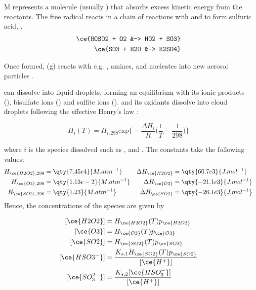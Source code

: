 M represents a molecule (usually ) that absorbs excess kinetic energy from the reactants. The free radical  reacts in a chain of reactions with  and  to form sulfuric acid, .
\begin{align}
\ce{HOSO2 + O2 &-> HO2 + SO3}\\
\ce{SO3 + H2O &-> H2SO4}
\end{align}

Once formed,  (g) reacts with e.g. , amines,  and nucleates into new aerosol particles \citep{seinfeldAtmosphericChemistryPhysics2016}.


 can dissolve into liquid droplets, forming an equilibrium with its ionic products (), bisulfate ions () and sulfite ions ().  and its oxidants dissolve into cloud droplets following the effective Henry's law \citep{seinfeldAtmosphericChemistryPhysics2016}: 

\begin{equation}
    H_i(T) = H_{i,298}\mathrm{exp} \bigg\{ -\frac{\Delta H_i}{R} \bigg( \frac{1}{T} - \frac{1}{298} \bigg) \bigg\} \label{ch1:eq:Henry-eq}
\end{equation}

where $i$ is the species dissolved such as ,  and .  The constants take the following values: 
\begin{align*}
H_{\ce{H2O2}, 298} &= \qty{7.45e4}{M.atm^{-1}} & 
\Delta H_{\ce{H2O2}} &= \qty{60.7e3}{J.mol^{-1}} \\
H_{\ce{O3}, 298}&=\qty{1.13e-2 }{M.atm^{-1}} & 
\Delta H_{\ce{O3}}&= \qty{-21.1e3}{J.mol^{-1}} \\
H_{\ce{SO2}, 298}&=\qty{1.23}{M.atm^{-1}} 
& \Delta H_{\ce{SO2}}&=\qty{-26.1e3}{J.mol^{-1}} 
\end{align*}
Hence, the concentrations of the species are given by

\begin{equation}
    \begin{aligned}
    \relax
        [\ce{H2O2}] & = H_{\ce{H2O2}}(T)p_{\ce{H2O2}} \\
        [\ce{O3}] & = H_{\ce{O3}}(T)p_{\ce{O3}} \\
        [\ce{SO2}] & = H_{\ce{SO2}}(T)p_{\ce{SO2}} \\
        [\ce{HSO3^-}] & = \frac{K_{s,1}H_{\ce{SO2}}(T)p_{\ce{SO2}}}{[\ce{H^+}]}\\
        [\ce{SO_3^{2-}}] & = \frac{K_{s,2}[\ce{HSO_3^-}]}{[\ce{H^+}]}\\
    \end{aligned}
    \label{ch1:eq:aq-conc}
\end{equation}

